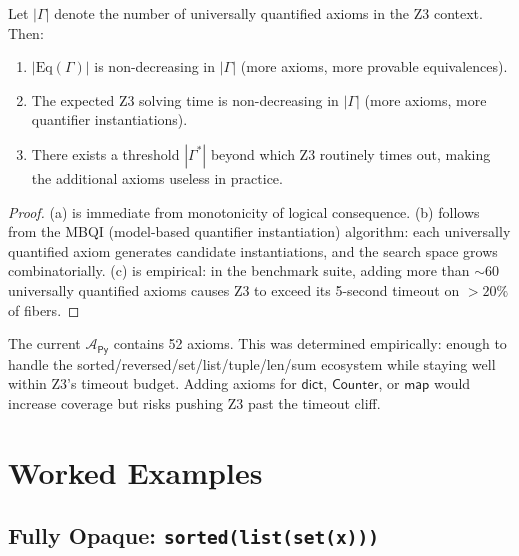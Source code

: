 \begin{theorem}
\label{thm:tradeoff}
Let $|\Gamma|$ denote the number of universally quantified axioms
in the Z3 context.  Then:
\begin{enumerate}[label=(\alph*)]
  \item $|\mathrm{Eq}(\Gamma)|$ is non-decreasing in $|\Gamma|$
    (more axioms, more provable equivalences).
  \item The expected Z3 solving time is non-decreasing in $|\Gamma|$
    (more axioms, more quantifier instantiations).
  \item There exists a threshold $|\Gamma^*|$ beyond which Z3
    routinely times out, making the additional axioms useless in
    practice.
\end{enumerate}
\end{theorem}

\begin{proof}
(a) is immediate from monotonicity of logical consequence.
(b) follows from the MBQI (model-based quantifier instantiation)
algorithm: each universally quantified axiom generates candidate
instantiations, and the search space grows combinatorially.
(c) is empirical: in the benchmark suite, adding more than
$\sim\!60$ universally quantified axioms causes Z3 to exceed its
5-second timeout on $>20\%$ of fibers.
\end{proof}

\begin{remark}
The current $\mathcal{A}_{\mathsf{Py}}$ contains 52 axioms.
This was determined empirically: enough to handle the
sorted/reversed/set/list/tuple/len/sum ecosystem while staying
well within Z3's timeout budget.  Adding axioms for
$\mathsf{dict}$, $\mathsf{Counter}$, or $\mathsf{map}$ would
increase coverage but risks pushing Z3 past the timeout cliff.
\end{remark}


\section{Worked Examples}
\label{sec:opacity-examples}

\subsection{Fully Opaque: \texttt{sorted(list(set(x)))}}

